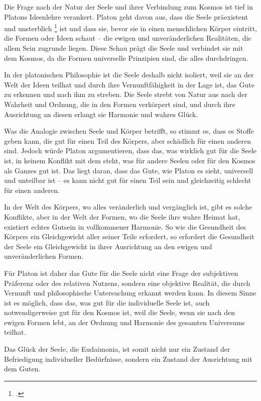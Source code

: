 \documentclass[12pt,a4paper]{article}
\begin{document}
Die Frage nach der Natur der Seele und ihrer Verbindung zum Kosmos ist tief in Platons Ideenlehre verankert. Platon geht davon aus, dass die Seele präexistent und unsterblich \footcite[524b]{gorgias} ist und dass sie, bevor sie in einen menschlichen Körper eintritt, die Formen oder Ideen schaut – die ewigen und unveränderlichen Realitäten, die allem Sein zugrunde liegen. Diese Schau prägt die Seele und verbindet sie mit dem Kosmos, da die Formen universelle Prinzipien sind, die alles durchdringen.

In der platonischen Philosophie ist die Seele deshalb nicht isoliert, weil sie an der Welt der Ideen teilhat und durch ihre Vernunftfähigkeit in der Lage ist, das Gute zu erkennen und nach ihm zu streben. Die Seele strebt von Natur aus nach der Wahrheit und Ordnung, die in den Formen verkörpert sind, und durch ihre Ausrichtung an diesen erlangt sie Harmonie und wahres Glück.

Was die Analogie zwischen Seele und Körper betrifft, so stimmt es, dass es Stoffe geben kann, die gut für einen Teil des Körpers, aber schädlich für einen anderen sind. Jedoch würde Platon argumentieren, dass das, was wirklich gut für die Seele ist, in keinem Konflikt mit dem steht, was für andere Seelen oder für den Kosmos als Ganzes gut ist. Das liegt daran, dass das Gute, wie Platon es sieht, universell und unteilbar ist – es kann nicht gut für einen Teil sein und gleichzeitig schlecht für einen anderen.

In der Welt des Körpers, wo alles veränderlich und vergänglich ist, gibt es solche Konflikte, aber in der Welt der Formen, wo die Seele ihre wahre Heimat hat, existiert echtes Gutsein in vollkommener Harmonie. So wie die Gesundheit des Körpers ein Gleichgewicht aller seiner Teile erfordert, so erfordert die Gesundheit der Seele ein Gleichgewicht in ihrer Ausrichtung an den ewigen und unveränderlichen Formen.

Für Platon ist daher das Gute für die Seele nicht eine Frage der subjektiven Präferenz oder des relativen Nutzens, sondern eine objektive Realität, die durch Vernunft und philosophische Untersuchung erkannt werden kann. In diesem Sinne ist es möglich, dass das, was gut für die individuelle Seele ist, auch notwendigerweise gut für den Kosmos ist, weil die Seele, wenn sie nach den ewigen Formen lebt, an der Ordnung und Harmonie des gesamten Universums teilhat.

Das Glück der Seele, die Eudaimonia, ist somit nicht nur ein Zustand der Befriedigung individueller Bedürfnisse, sondern ein Zustand der Ausrichtung mit dem Guten.
\end{document}
